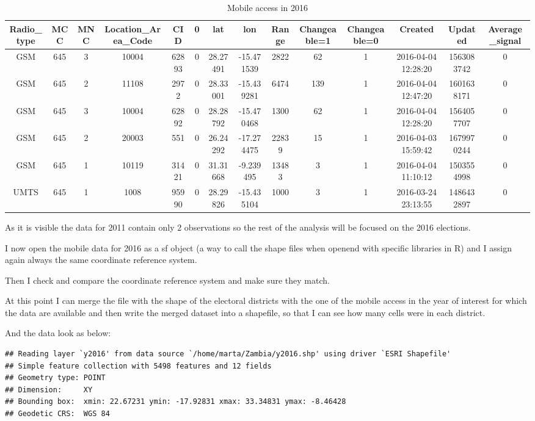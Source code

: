\documentclass[
]{article}
\begin{document}
\begin{longtable}[t]{cccccccccccccc}
\caption{\label{tab:year}\resizebox{\textwidth}{!} {Mobile access in 2016}}\\
\toprule
Radio\_type & MCC & MNC & Location\_Area\_Code & CID & 0 & lat & lon & Range & Changeable=1 & Changeable=0 & Created & Updated & Average\_signal\\
\midrule
GSM & 645 & 3 & 10004 & 62893 & 0 & 28.27491 & -15.471539 & 2822 & 62 & 1 & 2016-04-04 12:28:20 & 1563083742 & 0\\
GSM & 645 & 2 & 11108 & 2972 & 0 & 28.33001 & -15.439281 & 6474 & 139 & 1 & 2016-04-04 12:47:20 & 1601638171 & 0\\
GSM & 645 & 3 & 10004 & 62892 & 0 & 28.28792 & -15.470468 & 1300 & 62 & 1 & 2016-04-04 12:28:20 & 1564057707 & 0\\
GSM & 645 & 2 & 20003 & 551 & 0 & 26.24292 & -17.274475 & 22839 & 15 & 1 & 2016-04-03 15:59:42 & 1679970244 & 0\\
GSM & 645 & 1 & 10119 & 31421 & 0 & 31.31668 & -9.239495 & 13483 & 3 & 1 & 2016-04-04 11:10:12 & 1503554998 & 0\\
\addlinespace
UMTS & 645 & 1 & 1008 & 95990 & 0 & 28.29826 & -15.435104 & 1000 & 3 & 1 & 2016-03-24 23:13:55 & 1486432897 & 0\\
\bottomrule
\end{longtable}

As it is visible the data for 2011 contain only 2 observations so the
rest of the analysis will be focused on the 2016 elections.

I now open the mobile data for 2016 as a sf object (a way to call the
shape files when openend with specific libraries in R) and I assign
again always the same coordinate reference system.

Then I check and compare the coordinate reference system and make sure
they match.

At this point I can merge the file with the shape of the electoral
districts with the one of the mobile access in the year of interest for
which the data are available and then write the merged dataset into a
shapefile, so that I can see how many cells were in each district.

And the data look as below:

\begin{verbatim}
## Reading layer `y2016' from data source `/home/marta/Zambia/y2016.shp' using driver `ESRI Shapefile'
## Simple feature collection with 5498 features and 12 fields
## Geometry type: POINT
## Dimension:     XY
## Bounding box:  xmin: 22.67231 ymin: -17.92831 xmax: 33.34831 ymax: -8.46428
## Geodetic CRS:  WGS 84
\end{verbatim}
\end{document}
